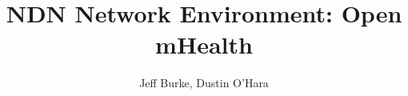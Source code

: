 \documentclass[10pt,onecolumn]{IEEEtran}
\begin{document}
\title{NDN Network Environment: Open mHealth}
\author{Jeff Burke, Dustin O'Hara}

\maketitle













 







\newpage 

 

\newpage 



\end{document}
